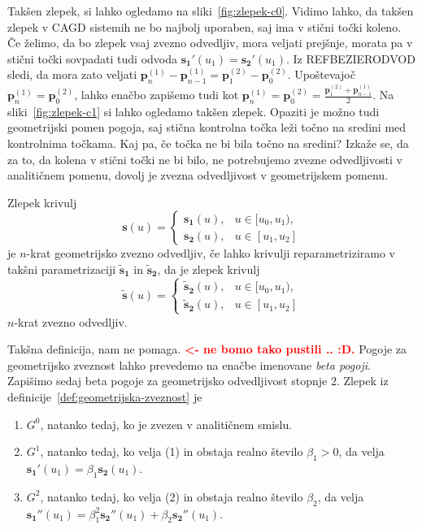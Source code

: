 \documentclass[isrm2, tisk]{fmfdelo}
\newcommand{\p}{\textbf{p}}
\newcommand{\mycomment}[1]{\textbf{\textcolor{red}{#1}}}
\begin{document}
    Takšen zlepek, si lahko ogledamo na sliki~\ref{fig:zlepek-c0}.
    Vidimo lahko, da takšen zlepek v CAGD sistemih ne bo najbolj uporaben, saj ima v stični točki koleno.
    Če želimo, da bo zlepek vsaj zvezno odvedljiv, mora veljati prejšnje, morata pa v stični točki sovpadati tudi odvoda $\mathbf{s_1}'(u_1) = \mathbf{s_2}'(u_1)$.
    Iz REFBEZIERODVOD sledi, da mora zato veljati $\p_{n}^{(1)} - \p_{n-1}^{(1)} = \p_{1}^{(2)} - \p_{0}^{(2)}$.
    Upoštevajoč $\p_n^{(1)} = \p_0^{(2)}$, lahko enačbo zapišemo tudi kot $\p_{n}^{(1)} =  \p_{0}^{(2)}  = \frac{\p_{1}^{(2)}+ \p_{n-1}^{(1)}}{2}$.
    Na sliki~\ref{fig:zlepek-c1} si lahko ogledamo takšen zlepek.
    Opaziti je možno tudi geometrijski pomen pogoja, saj stična kontrolna točka leži točno na sredini med kontrolnima točkama.
    Kaj pa, če točka ne bi bila točno na sredini?
    Izkaže se, da za to, da kolena v stični točki ne bi bilo, ne potrebujemo zvezne odvedljivosti v analitičnem pomenu, dovolj je zvezna odvedljivost v geometrijskem pomenu.
    \begin{definicija}
        \label{def:geometrijska-zveznost}
        Zlepek krivulj \[\mathbf{s}(u) = \begin{cases}
                                             \mathbf{s_1}(u), & u \in [u_0,u_1),  \\
                                             \mathbf{s_2}(u), & u \in [u_1,u_2]
        \end{cases}\] je $n$-krat geometrijsko zvezno odvedljiv, če lahko krivulji reparametriziramo v takšni parametrizaciji $\mathbf{\tilde{s}_1}$ in $\mathbf{\tilde{s}_2}$, da je zlepek krivulj
        \[\mathbf{\tilde{s}}(u) = \begin{cases}
                                      \mathbf{\tilde{s}_2}(u), & u \in [u_0,u_1),  \\
                                      \mathbf{\tilde{s}_2}(u), & u \in [u_1,u_2]
        \end{cases}\] $n$-krat zvezno odvedljiv.
    \end{definicija}
    Takšna definicija, nam ne pomaga. \mycomment{<- ne bomo tako pustili .. :D.}
    Pogoje za geometrijsko zveznost lahko prevedemo na enačbe imenovane \textit{beta pogoji}.
    Zapišimo sedaj beta pogoje za geometrijsko odvedljivost stopnje $2$.
    Zlepek iz definicije~\ref{def:geometrijska-zveznost} je
    \begin{enumerate}
        \item $G^0$, natanko tedaj, ko je zvezen v analitičnem smislu.
        \item $G^1$, natanko tedaj, ko velja (1) in obstaja realno število $\beta_1>0$, da velja $\mathbf{s_1'}(u_1) =\beta_1\mathbf{s_2}(u_1)$.
        \item $G^2$, natanko tedaj, ko velja (2) in obstaja realno število $\beta_2$, da velja $\mathbf{s_1''}(u_1) =\beta_1^2\mathbf{s_2''}(u_1) + \beta_2\mathbf{s_2''}(u_1)$.
    \end{enumerate}
\end{document}
